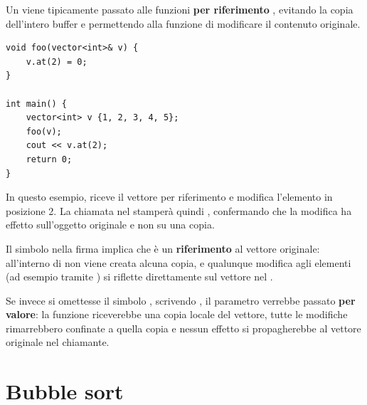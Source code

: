 \begin{codeexample}
Un  viene tipicamente passato alle funzioni
\textbf{per riferimento} , evitando la copia dell'intero
buffer e permettendo alla funzione di modificare il contenuto originale.



    \begin{codebox}

\begin{lstlisting}
void foo(vector<int>& v) {
    v.at(2) = 0;
}

int main() {
    vector<int> v {1, 2, 3, 4, 5};
    foo(v);
    cout << v.at(2);
    return 0;
}
\end{lstlisting}
\end{codebox}
\end{codeexample}

In questo esempio,  riceve il vettore per riferimento
e modifica l'elemento in posizione 2. La chiamata
 nel  stamper\`a quindi
, confermando che la modifica ha effetto sull'oggetto
originale e non su una copia.

Il simbolo \inlinecode{\&} nella firma  implica che
 \`e un \textbf{riferimento} al vettore originale: all'interno di
 non viene creata alcuna copia, e qualunque modifica agli elementi
(ad esempio tramite ) si riflette direttamente sul
vettore nel .

Se invece si omettesse il simbolo \inlinecode{\&}, scrivendo
, il parametro verrebbe passato
\textbf{per valore}: la funzione riceverebbe una copia locale del vettore,
tutte le modifiche rimarrebbero confinate a quella copia e
nessun effetto si propagherebbe al vettore originale nel chiamante.






























\section{Bubble sort}


